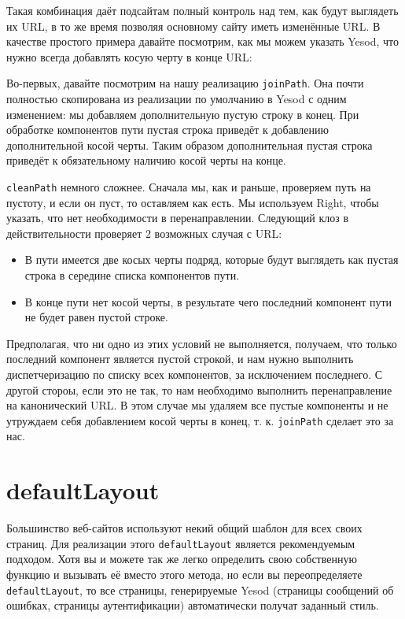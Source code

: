 Такая комбинация даёт подсайтам полный контроль над тем, как будут выглядеть их URL, в то же время позволяя основному сайту иметь изменённые URL. В качестве простого примера давайте посмотрим, как мы можем указать Yesod, что нужно всегда добавлять косую черту в конце URL:


Во-первых, давайте посмотрим на нашу реализацию \lstinline!joinPath!. Она почти полностью скопирована из реализации по умолчанию в Yesod с одним изменением: мы добавляем дополнительную пустую строку в конец. При обработке компонентов пути пустая строка приведёт к добавлению дополнительной косой черты. Таким образом дополнительная пустая строка приведёт к обязательному наличию косой черты на конце.

\lstinline!cleanPath! немного сложнее. Сначала мы, как и раньше, проверяем путь на пустоту, и если он пуст, то оставляем как есть. Мы используем Right, чтобы указать, что нет необходимости в перенаправлении. Следующий клоз в действительности проверяет 2 возможных случая с URL:

\begin{itemize}
  \item В пути имеется две косых черты подряд, которые будут выглядеть как пустая строка в середине списка компонентов пути.
  \item В конце пути нет косой черты, в результате чего последний компонент пути не будет равен пустой строке.
\end{itemize}

Предполагая, что ни одно из этих условий не выполняется, получаем, что только последний компонент является пустой строкой, и нам нужно выполнить диспетчеризацию по списку всех компонентов, за исключением последнего. С другой стороы, если это не так, то нам необходимо выполнить перенаправление на канонический URL. В этом случае мы удаляем все пустые компоненты и не утруждаем себя добавлением косой черты в конец, т. к. \lstinline!joinPath! сделает это за нас.

\section {defaultLayout}

Большинство веб-сайтов используют некий общий шаблон для всех своих страниц. Для реализации этого \lstinline!defaultLayout! является рекомендуемым подходом. Хотя вы и можете так же легко определить свою собственную функцию и вызывать её вместо этого метода, но если вы переопределяете \lstinline!defaultLayout!, то все страницы, генерируемые Yesod (страницы сообщений об ошибках, страницы аутентификации) автоматически получат заданный стиль.


